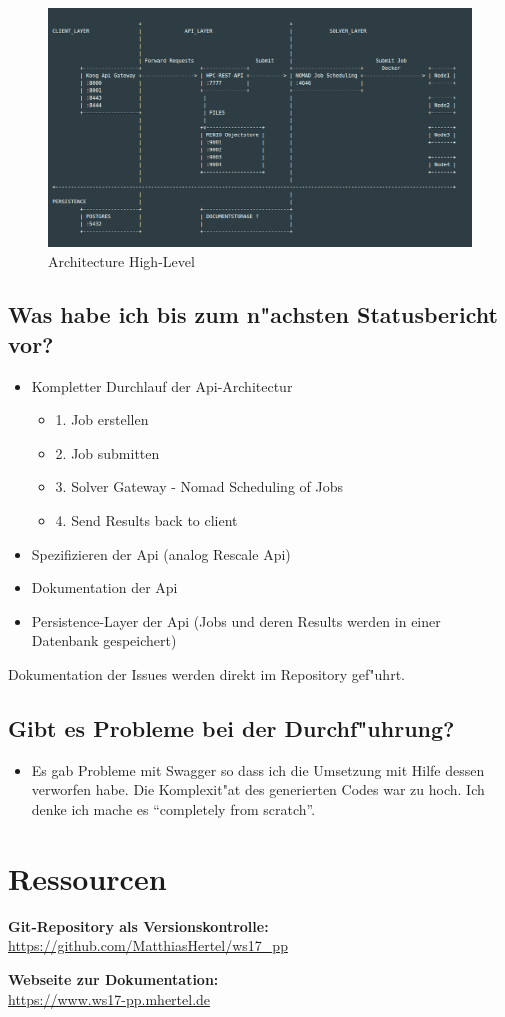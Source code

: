 \documentclass[12pt]{article}
\begin{document}
\begin{figure}[!htp]
	\includegraphics[width=1\textwidth]{./img/Architecture.png}
	\captionsetup{name=Abb.,font=footnotesize}
	\caption{Architecture High-Level}
\end{figure}

\subsection{Was habe ich bis zum n"achsten Statusbericht vor?}


\begin{itemize}
\item Kompletter Durchlauf der Api-Architectur
\begin{itemize}
	\item 1. Job erstellen
	\item 2. Job submitten
	\item 3. Solver Gateway - Nomad Scheduling of Jobs
	\item 4. Send Results back to client
\end{itemize}
\item Spezifizieren der Api (analog Rescale Api)
\item Dokumentation der Api
\item Persistence-Layer der Api (Jobs und deren Results werden in einer Datenbank gespeichert)
\end{itemize}

Dokumentation der Issues werden direkt im Repository gef"uhrt.
\subsection{Gibt es Probleme bei der Durchf"uhrung?}
\begin{itemize}
\item Es gab Probleme mit Swagger so dass ich die Umsetzung mit Hilfe dessen verworfen habe. Die Komplexit"at des generierten Codes war zu hoch. Ich denke ich mache es ``completely from scratch''.
\end{itemize}


\section{Ressourcen}
\textbf{Git-Repository als Versionskontrolle:}\\
\url{https://github.com/MatthiasHertel/ws17_pp}

\textbf{Webseite zur Dokumentation:}\\
\url{https://www.ws17-pp.mhertel.de}
\end{document}
